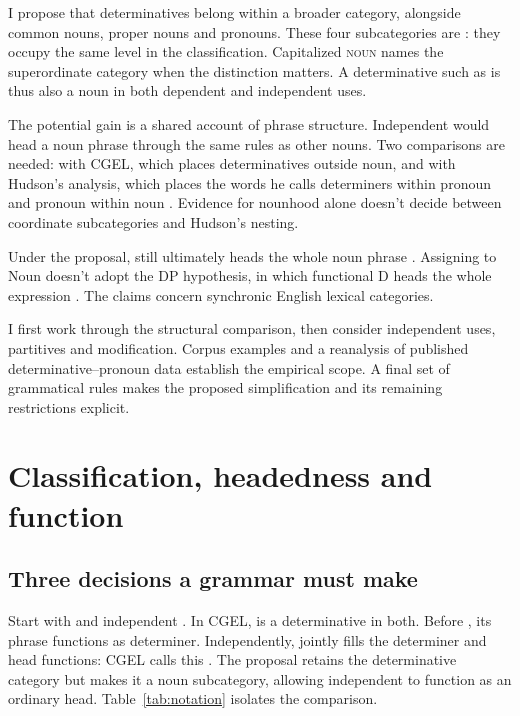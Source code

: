 \documentclass[12pt]{article}
\begin{document}
I propose that determinatives belong within a broader  category, alongside common nouns, proper nouns and pronouns. These four subcategories are : they occupy the same level in the classification. Capitalized \textsc{noun} names the superordinate category when the distinction matters. A determinative such as  is thus also a noun in both dependent and independent uses.

The potential gain is a shared account of phrase structure. Independent  would head a noun phrase through the same rules as other nouns. Two comparisons are needed: with CGEL, which places determinatives outside noun, and with Hudson's analysis, which places the words he calls determiners within pronoun and pronoun within noun \citep{hudson2004determiners,hudson2010wordgrammar}. Evidence for nounhood alone doesn't decide between coordinate subcategories and Hudson's nesting.

Under the proposal,  still ultimately heads the whole noun phrase . Assigning  to Noun doesn't adopt the DP hypothesis, in which functional D heads the whole expression \citep{abney1987}. The claims concern synchronic English lexical categories.

I first work through the structural comparison, then consider independent uses, partitives and modification. Corpus examples and a reanalysis of published determinative--pronoun data establish the empirical scope. A final set of grammatical rules makes the proposed simplification and its remaining restrictions explicit.

\section{Classification, headedness and function}\label{sec:alternatives}

\subsection{Three decisions a grammar must make}

Start with  and independent . In CGEL,  is a determinative in both. Before , its phrase functions as determiner. Independently,  jointly fills the determiner and head functions: CGEL calls this  \citep[410--412]{huddleston2002}. The proposal retains the determinative category but makes it a noun subcategory, allowing independent  to function as an ordinary head. Table~\ref{tab:notation} isolates the comparison.
\end{document}
